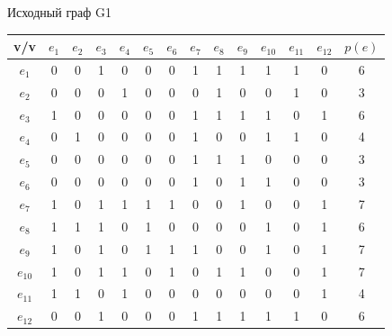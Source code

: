 \documentclass[a4paper,12pt]{article}
\begin{document}
\noindent 
Исходный граф G1
\begin{table}[H]
    \centering
    \begin{tabular}{|c|c|c|c|c|c|c|c|c|c|c|c|c|c|}
    \hline
        v/v & $e_1$ & $e_2$ & $e_3$ & $e_4$ & $e_5$ & $e_6$ & $e_7$ & $e_8$ & $e_9$ & $e_{10}$ & $e_{11}$ & $e_{12}$ & $p(e)$ \\ \hline
        $e_1$ & 0 & 0 & 1 & 0 & 0 & 0 & 1 & 1 & 1 & 1 & 1 & 0 & 6 \\ \hline
        $e_2$ & 0 & 0 & 0 & 1 & 0 & 0 & 0 & 1 & 0 & 0 & 1 & 0 & 3 \\ \hline
        $e_3$ & 1 & 0 & 0 & 0 & 0 & 0 & 1 & 1 & 1 & 1 & 0 & 1 & 6 \\ \hline
        $e_4$ & 0 & 1 & 0 & 0 & 0 & 0 & 1 & 0 & 0 & 1 & 1 & 0 & 4 \\ \hline
        $e_5$ & 0 & 0 & 0 & 0 & 0 & 0 & 1 & 1 & 1 & 0 & 0 & 0 & 3 \\ \hline
        $e_6$ & 0 & 0 & 0 & 0 & 0 & 0 & 1 & 0 & 1 & 1 & 0 & 0 & 3 \\ \hline
        $e_7$ & 1 & 0 & 1 & 1 & 1 & 1 & 0 & 0 & 1 & 0 & 0 & 1 & 7 \\ \hline
        $e_8$ & 1 & 1 & 1 & 0 & 1 & 0 & 0 & 0 & 0 & 1 & 0 & 1 & 6 \\ \hline
        $e_9$ & 1 & 0 & 1 & 0 & 1 & 1 & 1 & 0 & 0 & 1 & 0 & 1 & 7 \\ \hline
        $e_{10}$ & 1 & 0 & 1 & 1 & 0 & 1 & 0 & 1 & 1 & 0 & 0 & 1 & 7 \\ \hline
        $e_{11}$ & 1 & 1 & 0 & 1 & 0 & 0 & 0 & 0 & 0 & 0 & 0 & 1 & 4 \\ \hline
        $e_{12}$ & 0 & 0 & 1 & 0 & 0 & 0 & 1 & 1 & 1 & 1 & 1 & 0 & 6 \\ \hline
    \end{tabular}
\end{table}
\end{document}
